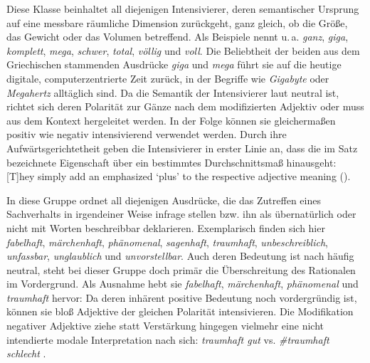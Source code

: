 
Diese Klasse beinhaltet all diejenigen Intensivierer, deren semantischer Ursprung auf eine messbare räumliche Dimension zurückgeht, ganz gleich, ob die Größe, das Gewicht oder das Volumen betreffend. Als Beispiele nennt \citet[354]{Claudi.2006} u.\,a. \textit{ganz}, \textit{giga}, \textit{komplett}, \textit{mega}, \textit{schwer}, \textit{total}, \textit{völlig} und \textit{voll}. Die Beliebtheit der beiden aus dem Griechischen stammenden Ausdrücke \textit{giga} und \textit{mega} führt sie auf die heutige digitale, computerzentrierte Zeit zurück, in der Begriffe wie \textit{Gigabyte} oder \textit{Megahertz} alltäglich sind. Da die Semantik der Intensivierer laut \citet[354]{Claudi.2006} neutral ist, richtet sich deren Polarität zur Gänze nach dem modifizierten Adjektiv oder muss aus dem Kontext hergeleitet werden. In der Folge können sie gleichermaßen positiv wie negativ intensivierend verwendet werden. Durch ihre Aufwärtsgerichtetheit geben die Intensivierer in erster Linie an, dass die im Satz bezeichnete Eigenschaft über ein bestimmtes Durchschnittsmaß hinausgeht: \glqq{}[T]hey simply add an emphasized `plus' to the respective adjective meaning\grqq{} (\citealt[354]{Claudi.2006}).


In diese Gruppe ordnet \citet[355]{Claudi.2006} all diejenigen Ausdrücke, die das Zutreffen eines Sachverhalts in irgendeiner Weise infrage stellen bzw. ihn als übernatürlich oder nicht mit Worten beschreibbar deklarieren. Exemplarisch finden sich hier \textit{fabelhaft}, \textit{märchenhaft}, \textit{phänomenal}, \textit{sagenhaft}, \textit{traumhaft}, \textit{unbeschreiblich}, \textit{unfassbar}, \textit{unglaublich} und \textit{unvorstellbar}. Auch deren Bedeutung ist nach {\citet[355]{Claudi.2006}} häufig neutral, steht bei dieser Gruppe doch primär die Überschreitung des Rationalen im Vordergrund. Als Ausnahme hebt sie \textit{fabelhaft}, \textit{märchenhaft}, \textit{phänomenal} und \textit{traumhaft} hervor: Da deren inhärent positive Bedeutung noch vordergründig ist, können sie bloß Adjektive der gleichen Polarität intensivieren. Die Modifikation negativer Adjektive ziehe statt Verstärkung hingegen vielmehr eine nicht intendierte modale Interpretation nach sich: \textit{traumhaft gut} vs. \textit{\#traumhaft schlecht} \citep[vgl.][356]{Claudi.2006}.


